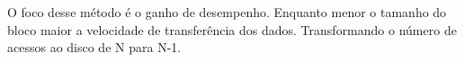 \begin{question}
     
    O foco desse método é o ganho de desempenho. Enquanto menor o tamanho do bloco 
    maior a velocidade de transferência dos dados. Transformando o número de acessos ao disco de 
    N para N-1.

\end{question}
